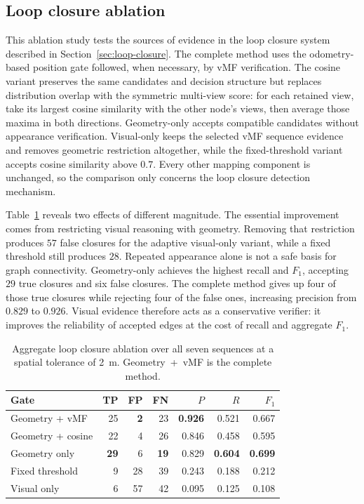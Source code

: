 \documentclass[5p,twocolumn,nonatbib,reversenotenum]{elsarticle}
\begin{document}
\subsection{Loop closure ablation}
This ablation study tests the sources of evidence in the loop closure system described in Section~\ref{sec:loop-closure}. The complete method uses the odometry-based position gate followed, when necessary, by vMF verification. The cosine variant preserves the same candidates and decision structure but replaces distribution overlap with the symmetric multi-view score: for each retained view, take its largest cosine similarity with the other node's views, then average those maxima in both directions. Geometry-only accepts compatible candidates without appearance verification. Visual-only keeps the selected vMF sequence evidence and removes geometric restriction altogether, while the fixed-threshold variant accepts cosine similarity above $0.7$. Every other mapping component is unchanged, so the comparison only concerns the loop closure detection mechanism.

Table~\ref{tab:ablation} reveals two effects of different magnitude. The essential improvement comes from restricting visual reasoning with geometry. Removing that restriction produces $57$ false closures for the adaptive visual-only variant, while a fixed threshold still produces $28$. Repeated appearance alone is not a safe basis for graph connectivity. Geometry-only achieves the highest recall and $F_1$, accepting $29$ true closures and six false closures. The complete method gives up four of those true closures while rejecting four of the false ones, increasing precision from $0.829$ to $0.926$. Visual evidence therefore acts as a conservative verifier: it improves the reliability of accepted edges at the cost of recall and aggregate $F_1$.

\begin{table}[!htbp]
    \centering
    \caption{Aggregate loop closure ablation over all seven sequences at a spatial tolerance of \qty{2}{\metre}. Geometry~+~vMF is the complete method.}
    \label{tab:ablation}
    \small
    \setlength{\tabcolsep}{3.5pt}
    \begin{tabular}{lrrrrrr}
    \hline
    Gate & TP & FP & FN & $P$ & $R$ & $F_1$\\
    \hline
    Geometry + vMF    & 25 & \textbf{2}  & 23 & \textbf{0.926} & 0.521 & 0.667\\
    Geometry + cosine & 22 & 4  & 26 & 0.846 & 0.458 & 0.595\\
    Geometry only     & \textbf{29} & 6  & \textbf{19} & 0.829 & \textbf{0.604} & \textbf{0.699}\\
    Fixed threshold   &  9 & 28 & 39 & 0.243 & 0.188 & 0.212\\
    Visual only       &  6 & 57 & 42 & 0.095 & 0.125 & 0.108\\
    \hline
    \end{tabular}
\end{table}
\end{document}
